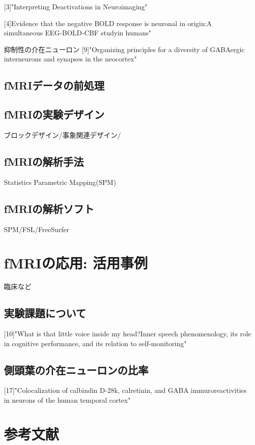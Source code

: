 \documentclass[uplatex, a4j, twocolumn]{article}
\begin{document}
[3]"Interpreting Deactivations in Neuroimaging"

[4]Evidence that the negative BOLD response is neuronal in origin:A simultaneous EEG-BOLD-CBF studyin humans"

抑制性の介在ニューロン
[9]"Organizing principles for a diversity of GABAergic interneurons and synapses in the neocortex"

\subsection{fMRIデータの前処理}

\subsection{fMRIの実験デザイン}
ブロックデザイン/事象関連デザイン/
\subsection{fMRIの解析手法}
Statistics Parametric Mapping(SPM)
\subsection{fMRIの解析ソフト}
SPM/FSL/FreeSurfer
\section{fMRIの応用: 活用事例}
臨床など

\subsection{実験課題について}
[10]"What is that little voice inside my head?Inner speech phenomenology, its role in cognitive performance, and its relation to self-monitoring"


\subsection{側頭葉の介在ニューロンの比率}
[17]"Colocalization of calbindin D-28k, calretinin, and GABA immuroreactivities in neurons of the human temporal cortex"

\section{参考文献}
\end{document}
